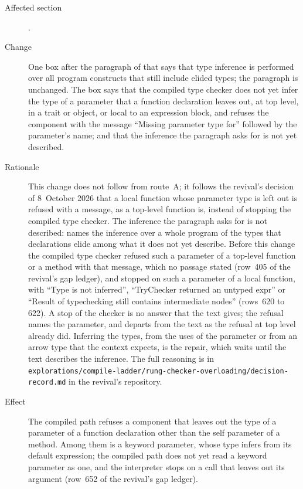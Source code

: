 \begin{description}
\item[Affected section] .
\item[Change] One box after the paragraph of 
that says that type inference is performed over all program constructs that
still include elided types; the paragraph is unchanged.
The box says that the compiled type checker does not yet infer the type of a
parameter that a function declaration leaves out, at top level, in a trait or
object, or local to an expression block, and refuses the component with the
message ``Missing parameter type for'' followed by the parameter's name; and
that the inference the paragraph asks for is not yet described.
\item[Rationale] This change does not follow from route~A; it follows the
revival's decision of 8~October 2026 that a local function whose parameter
type is left out is refused with a message, as a top-level function is,
instead of stopping the compiled type checker.
The inference the paragraph asks for is not described:
 names the inference over a whole program of the types
that declarations elide among what it does not yet describe.
Before this change the compiled type checker refused such a parameter of a
top-level function or a method with that message, which no passage stated
(row~405 of the revival's gap ledger), and stopped on such a parameter of a
local function, with ``Type is not inferred'', ``TryChecker returned an untyped
expr'' or ``Result of typechecking still contains intermediate nodes'' (rows~620
to 622).
A stop of the checker is no answer that the text gives; the refusal names the
parameter, and departs from the text as the refusal at top level already did.
Inferring the types, from the uses of the parameter or from an arrow type that
the context expects, is the repair, which waits until the text describes the
inference.
The full reasoning is in
\nolinkurl{explorations/compile-ladder/rung-checker-overloading/decision-record.md}
in the revival's repository.
\item[Effect] The compiled path refuses a component that leaves out the type
of a parameter of a function declaration other than the self parameter of a
method.
Among them is a keyword parameter, whose type  infers
from its default expression; the compiled path does not yet read a keyword
parameter as one, and the interpreter stops on a call that leaves out its
argument (row~652 of the revival's gap ledger).

\end{description}
